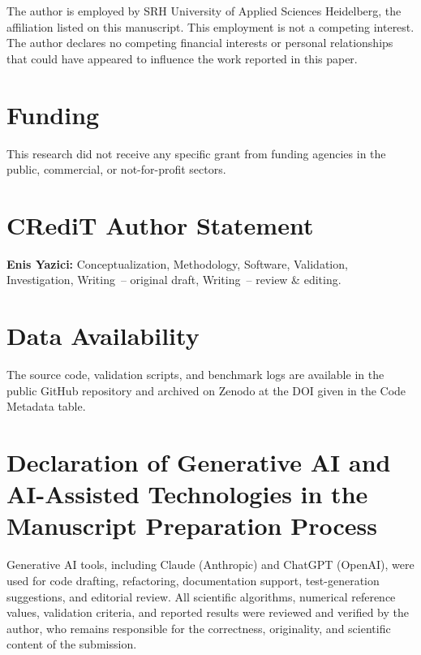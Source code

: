 \documentclass[1p,times]{elsarticle}
\begin{document}
The author is employed by SRH University of Applied Sciences Heidelberg, the
affiliation listed on this manuscript. This employment is not a competing
interest. The author declares no competing financial interests or personal
relationships that could have appeared to influence the work reported in this
paper.

\section*{Funding}

This research did not receive any specific grant from funding agencies in the
public, commercial, or not-for-profit sectors.

\section*{CRediT Author Statement}

\textbf{Enis Yazici:} Conceptualization, Methodology, Software, Validation,
Investigation, Writing~-- original draft, Writing~-- review \& editing.

\section*{Data Availability}

The source code, validation scripts, and benchmark logs are available in the
public GitHub repository and archived on Zenodo at the DOI given in the Code
Metadata table.

\section*{Declaration of Generative AI and AI-Assisted Technologies
  in the Manuscript Preparation Process}

Generative AI tools, including Claude (Anthropic) and ChatGPT (OpenAI), were
used for code drafting, refactoring, documentation support, test-generation
suggestions, and editorial review.
All scientific algorithms, numerical reference values, validation criteria, and
reported results were reviewed and verified by the author, who remains
responsible for the correctness, originality, and scientific content of the
submission.
\end{document}
